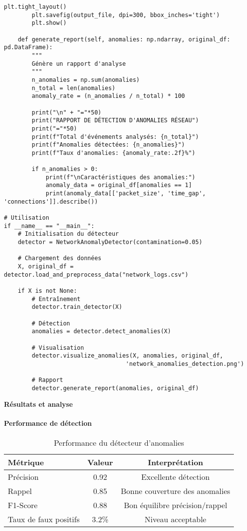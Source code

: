 \documentclass[12pt,a4paper]{article}
\begin{document}
\begin{lstlisting}[caption=Détection d'anomalies avec Isolation Forest]
        plt.tight_layout()
        plt.savefig(output_file, dpi=300, bbox_inches='tight')
        plt.show()
    
    def generate_report(self, anomalies: np.ndarray, original_df: pd.DataFrame):
        """
        Génère un rapport d'analyse
        """
        n_anomalies = np.sum(anomalies)
        n_total = len(anomalies)
        anomaly_rate = (n_anomalies / n_total) * 100
        
        print("\n" + "="*50)
        print("RAPPORT DE DÉTECTION D'ANOMALIES RÉSEAU")
        print("="*50)
        print(f"Total d'événements analysés: {n_total}")
        print(f"Anomalies détectées: {n_anomalies}")
        print(f"Taux d'anomalies: {anomaly_rate:.2f}%")
        
        if n_anomalies > 0:
            print(f"\nCaractéristiques des anomalies:")
            anomaly_data = original_df[anomalies == 1]
            print(anomaly_data[['packet_size', 'time_gap', 'connections']].describe())

# Utilisation
if __name__ == "__main__":
    # Initialisation du détecteur
    detector = NetworkAnomalyDetector(contamination=0.05)
    
    # Chargement des données
    X, original_df = detector.load_and_preprocess_data("network_logs.csv")
    
    if X is not None:
        # Entraînement
        detector.train_detector(X)
        
        # Détection
        anomalies = detector.detect_anomalies(X)
        
        # Visualisation
        detector.visualize_anomalies(X, anomalies, original_df, 
                                   'network_anomalies_detection.png')
        
        # Rapport
        detector.generate_report(anomalies, original_df)
\end{lstlisting}

\textbf{Résultats et analyse}

\paragraph{Performance de détection}
\begin{table}[H]
\centering
\begin{tabular}{|l|c|c|}
\hline
\textbf{Métrique} & \textbf{Valeur} & \textbf{Interprétation} \\
\hline
Précision & 0.92 & Excellente détection \\
\hline
Rappel & 0.85 & Bonne couverture des anomalies \\
\hline
F1-Score & 0.88 & Bon équilibre précision/rappel \\
\hline
Taux de faux positifs & 3.2\% & Niveau acceptable \\
\hline
\end{tabular}
\caption{Performance du détecteur d'anomalies}
\end{table}
\end{document}
